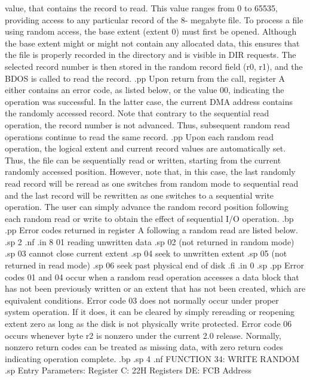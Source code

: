 value, that contains the record to read.  This value ranges from 
0 to 65535, providing access to any particular record of the 8-
megabyte file.  To process a file using random access, the base 
extent (extent 0) must first be opened.  Although the base extent 
might or might not contain any allocated data, this ensures that the 
file is properly recorded in the directory and is visible in DIR 
requests.  The selected record number is then stored in the 
random record field (r0, r1), and the BDOS is called to read the 
record.  
.pp
Upon return from the call, register A either contains an error 
code, as listed below, or the value 00, indicating the operation 
was successful.  In the latter case, the current DMA address 
contains the randomly accessed record.  Note that 
contrary to the sequential read operation, the record number is 
not advanced.  Thus, subsequent random read operations continue 
to read the same record.
.pp
Upon each random read operation, the logical extent and current 
record values are automatically set.  Thus, the file can be 
sequentially read or written, starting from the current randomly 
accessed position.  However, note that, in this 
case, the last randomly read record will be reread as one 
switches from random mode to sequential read and the last record 
will be rewritten as one switches to a sequential write operation.  
The user can simply advance the random record 
position following each random read or write to obtain the effect 
of sequential I/O operation.
.bp
.pp
Error codes returned in register A following a random read are 
listed below.
.sp 2
.nf
.in 8
01   reading unwritten data
.sp
02   (not returned in random mode)
.sp
03   cannot close current extent
.sp
04   seek to unwritten extent
.sp
05   (not returned in read mode)
.sp
06   seek past physical end of disk
.fi
.in 0
.sp 
.pp
Error codes 01 and 04 occur when a random read operation accesses 
a data block that has not been previously written or an extent 
that has not been created, which are equivalent conditions.  
Error code 03 does not normally occur under proper system 
operation.  If it does, it can be cleared by simply rereading or 
reopening extent zero as long as the disk is not physically write 
protected.  Error code 06 occurs whenever byte r2 is nonzero 
under the current 2.0 release.  Normally, nonzero return codes 
can be treated as missing data, with zero return codes indicating 
operation complete.
.bp
.sp 4
.nf
                   FUNCTION 34:  WRITE RANDOM
.sp
                Entry Parameters:
                      Register C:  22H
                    Registers DE:  FCB Address

